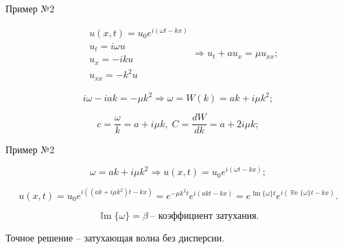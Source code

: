 \documentclass[10pt,xcolor=pst,aspectratio=169]{beamer}
\begin{document}
\begin{frame}{Пример №2}

    \transdissolve[duration=0.1]
    \justifying
    \large

    \[
        \boxed{
            \begin{split}
                &u \left( x, t \right) = u_{0} e^{i \left( \omega t - k x \right)} \\
                &u_{t} = i \omega u \\
                &u_{x} = - i k u \\
                &u_{xx} = - k^{2} u
            \end{split}
        }
        \Rightarrow
        \boxed{
            u_{t} + a u_{x} = \mu u_{xx}
        };
    \]

    \[
        i \omega - i a k = - \mu k^{2}
        \Rightarrow
        \omega = W \left( k \right) = a k + \boxed{i \mu k^{2}};
    \]

    \[
        c = \frac{\omega}{k} = a + \boxed{i \mu k}, \; C = \frac{d W}{d k} = a + \boxed{2 i \mu k};
    \]

\end{frame}

\begin{frame}{Пример №2}

    \transdissolve[duration=0.1]
    \justifying
    \large

    \[
         \omega = a k + i \mu k^{2} \Rightarrow u \left( x, t \right) = u_{0} e^{i \left( \omega t - k x \right)};
    \]

    \[
        u \left( x, t \right) = u_{0} e^{i \left( \left( a k + i \mu k^{2} \right) t - k x \right)} = e^{- \mu k^{2} t} e^{i \left( a k t - k x \right)} = e^{\operatorname{\mathbb{I}m}\{\omega\} t} e^{i \left( \operatorname{\mathbb{R}e}\{\omega\} t - k x \right)}.
    \]

    \[
        \operatorname{\mathbb{I}m}\{\omega\} = \beta \: \mbox{-- коэффициент затухания}.
    \]

    \begin{center}
        Точное решение -- затухающая волна без дисперсии.
    \end{center}

\end{frame}
\end{document}
